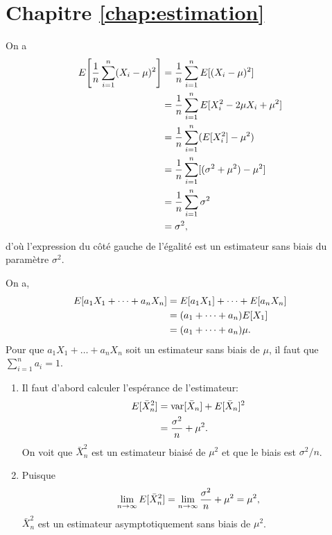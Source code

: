 \section*{Chapitre \ref{chap:estimation}}

\begin{solution}{3.1}
    On a
    \begin{align*}
      E\! \left[ \frac{1}{n}\sum_{i=1}^n(X_i - \mu)^2 \right]
      &= \frac{1}{n} \sum_{i=1}^n E [ (X_i-\mu)^2 ] \\
      &= \frac{1}{n} \sum_{i=1}^n E [ X_i^2 -2\mu X_i + \mu^2 ] \\
      &= \frac{1}{n} \sum_{i=1}^n (E [ X_i^2 ] - \mu^2) \\
      &= \frac{1}{n} \sum_{i=1}^n [(\sigma^2 + \mu^2) - \mu^2] \\
      &= \frac{1}{n} \sum_{i=1}^n \sigma^2 \\
      &= \sigma^2,
    \end{align*}
    d'où l'expression du côté gauche de l'égalité est un estimateur
    sans biais du paramètre $\sigma^2$.
  
\end{solution}
\begin{solution}{3.2}
    On a,
    \begin{align*}
      E [ a_1 X_1 + \dots + a_n X_n ]
      &= E [ a_1 X_1 ] + \dots + E [ a_n X_n ]\\
      &= (a_1 + \dots + a_n) E [ X_1 ] \\
      &= (a_1 + \dots + a_n) \mu.
    \end{align*}
    Pour que $a_1 X_1 + \dots + a_n X_n$ soit un estimateur sans biais
    de $\mu$, il faut que $\sum_{i=1}^n a_i = 1$.
  
\end{solution}
\begin{solution}{3.3}
    \begin{enumerate}
    \item Il faut d'abord calculer l'espérance de l'estimateur:
      \begin{align*}
        E [ \bar{X}_n^2 ] &= \mathrm{var} [ \bar{X}_n ] + E [ \bar{X}_n ]^2 \\
        &= \frac{\sigma^2}{n} + \mu^2.
      \end{align*}
      On voit que $\bar{X}_n^2$ est un estimateur biaisé de $\mu^2$ et
      que le biais est $\sigma^2/n$.
    \item Puisque
      \begin{align*}
        \lim_{n \rightarrow \infty} E [ \bar{X}_n^2 ] =
        \lim_{n \rightarrow \infty} \frac{\sigma^2}{n} + \mu^2 = \mu^2,
      \end{align*}
      $\bar{X}_n^2$ est un estimateur asymptotiquement sans biais de
      $\mu^2$.
    \end{enumerate}
  
\end{solution}
